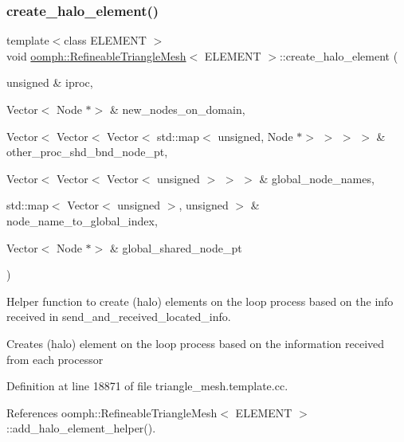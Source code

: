 \mbox{\label{classoomph_1_1RefineableTriangleMesh_aac106ac220a5e794234ca75378371342}} 
\subsubsection{\texorpdfstring{create\+\_\+halo\+\_\+element()}{create\_halo\_element()}}
{\footnotesize\ttfamily template$<$class E\+L\+E\+M\+E\+NT $>$ \\
void \hyperlink{classoomph_1_1RefineableTriangleMesh}{oomph\+::\+Refineable\+Triangle\+Mesh}$<$ E\+L\+E\+M\+E\+NT $>$\+::create\+\_\+halo\+\_\+element (\begin{DoxyParamCaption}\item[{unsigned \&}]{iproc,  }\item[{Vector$<$ Node $\ast$$>$ \&}]{new\+\_\+nodes\+\_\+on\+\_\+domain,  }\item[{Vector$<$ Vector$<$ Vector$<$ std\+::map$<$ unsigned, Node $\ast$$>$ $>$ $>$ $>$ \&}]{other\+\_\+proc\+\_\+shd\+\_\+bnd\+\_\+node\+\_\+pt,  }\item[{Vector$<$ Vector$<$ Vector$<$ unsigned $>$ $>$ $>$ \&}]{global\+\_\+node\+\_\+names,  }\item[{std\+::map$<$ Vector$<$ unsigned $>$, unsigned $>$ \&}]{node\+\_\+name\+\_\+to\+\_\+global\+\_\+index,  }\item[{Vector$<$ Node $\ast$$>$ \&}]{global\+\_\+shared\+\_\+node\+\_\+pt }\end{DoxyParamCaption})\hspace{0.3cm}{\ttfamily [protected]}}



Helper function to create (halo) elements on the loop process based on the info received in send\+\_\+and\+\_\+received\+\_\+located\+\_\+info. 

Creates (halo) element on the loop process based on the information received from each processor 

Definition at line 18871 of file triangle\+\_\+mesh.\+template.\+cc.



References oomph\+::\+Refineable\+Triangle\+Mesh$<$ E\+L\+E\+M\+E\+N\+T $>$\+::add\+\_\+halo\+\_\+element\+\_\+helper().



